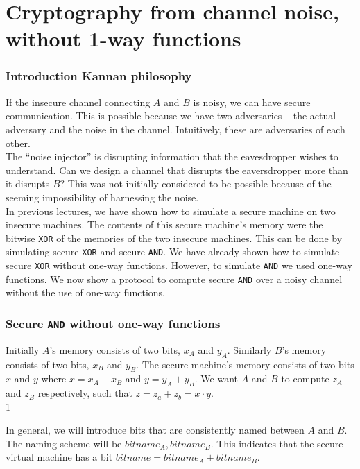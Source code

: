 
\chapter{Cryptography from channel noise, without 1-way functions}

\subsection{Introduction Kannan philosophy}
If the insecure channel connecting $A$ and $B$ is noisy, we can have secure communication.
This is possible because we have two adversaries -- the actual adversary and the noise
in the channel. Intuitively, these are adversaries of each other. \\

The ``noise injector'' is disrupting information that the eavesdropper wishes to understand. Can we design a channel that disrupts the eaversdropper more than it disrupts $B$? This was not initially considered to be  possible because of the seeming impossibility of harnessing the noise. \\

In previous lectures, we have shown how to simulate a secure machine on two insecure machines. The contents of this secure machine's memory were the bitwise \texttt{XOR} of the memories of the two insecure machines. This can be done by simulating secure \texttt{XOR} and secure \texttt{AND}. We have already shown how to simulate secure \texttt{XOR} without one-way functions. However, to simulate \texttt{AND} we used one-way functions. We now show a protocol to compute secure \texttt{AND} over a noisy channel without the use of one-way functions. 

\subsection{Secure \texttt{AND} without one-way functions}

Initially $A$'s memory consists of two bits, $x_A$ and $y_A$. Similarly $B$'s memory consists of two bits, $x_B$ and  $y_B$. The secure machine's memory consists of two bits $x$ and $y$ where $x = x_A + x_B$ and $y = y_A + y_B$. We want $A$ and $B$ to compute $z_A$ and $z_B$ respectively, such that $z = z_a + z_b = x \cdot y$. \\1

In general, we will introduce bits that are consistently named between $A$ and $B$. The naming scheme will be
$bitname_A, bitname_B$. This indicates that the secure virtual machine has a bit $bitname = bitname_A + bitname_B$.

